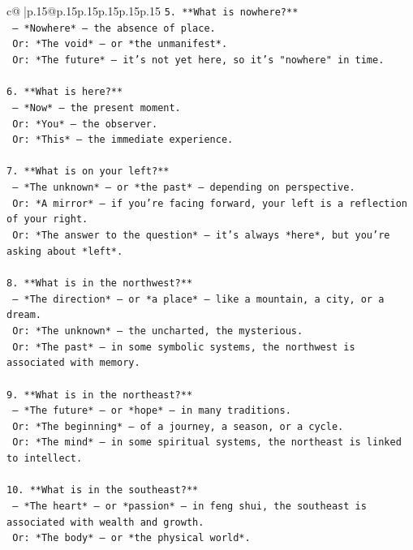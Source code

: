\documentclass{article}
\begin{document}
{\begin{supertabular}{c@{$\;$}|p{.15\linewidth}@{}p{.15\linewidth}p{.15\linewidth}p{.15\linewidth}p{.15\linewidth}p{.15\linewidth}}
{{{\texttt{5. **What is nowhere?**  } \\
\texttt{   — *Nowhere* — the absence of place.  } \\
\texttt{   Or: *The void* — or *the unmanifest*.  } \\
\texttt{   Or: *The future* — it's not yet here, so it's "nowhere" in time.} \\
\\ 
\texttt{6. **What is here?**  } \\
\texttt{   — *Now* — the present moment.  } \\
\texttt{   Or: *You* — the observer.  } \\
\texttt{   Or: *This* — the immediate experience.} \\
\\ 
\texttt{7. **What is on your left?**  } \\
\texttt{   — *The unknown* — or *the past* — depending on perspective.  } \\
\texttt{   Or: *A mirror* — if you're facing forward, your left is a reflection of your right.  } \\
\texttt{   Or: *The answer to the question* — it's always *here*, but you're asking about *left*.} \\
\\ 
\texttt{8. **What is in the northwest?**  } \\
\texttt{   — *The direction* — or *a place* — like a mountain, a city, or a dream.  } \\
\texttt{   Or: *The unknown* — the uncharted, the mysterious.  } \\
\texttt{   Or: *The past* — in some symbolic systems, the northwest is associated with memory.} \\
\\ 
\texttt{9. **What is in the northeast?**  } \\
\texttt{   — *The future* — or *hope* — in many traditions.  } \\
\texttt{   Or: *The beginning* — of a journey, a season, or a cycle.  } \\
\texttt{   Or: *The mind* — in some spiritual systems, the northeast is linked to intellect.} \\
\\ 
\texttt{10. **What is in the southeast?**  } \\
\texttt{   — *The heart* — or *passion* — in feng shui, the southeast is associated with wealth and growth.  } \\
\texttt{   Or: *The body* — or *the physical world*.  } \\
}}}
\end{supertabular}}
\end{document}
